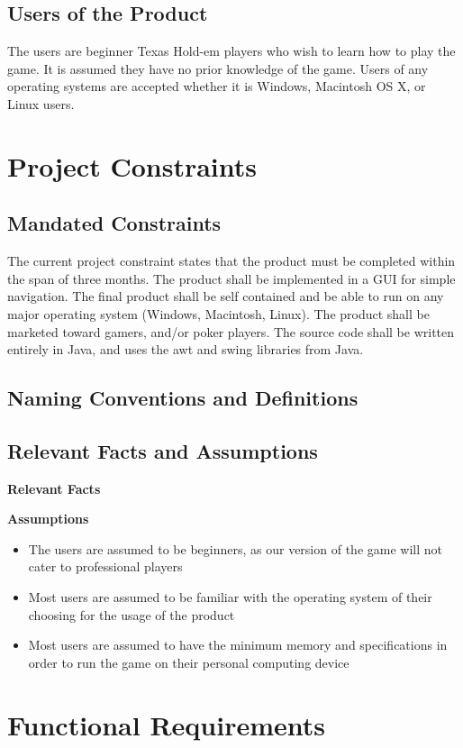 \documentclass[12pt]{article}
\begin{document}
	\subsection{Users of the Product}
	The users are beginner Texas Hold-em players who wish to learn how to play the game. It 	is assumed they have no prior knowledge of the game.  Users of any operating systems 		are accepted whether it is Windows, Macintosh OS X, or Linux users. 
	
	\section{Project Constraints}
	\subsection{Mandated Constraints}
	The current project constraint states that the product must be completed within the 		span of three months. The product shall be implemented in a GUI for simple navigation. 		The final product shall be self contained and be able to run on any major operating 		system (Windows, Macintosh, Linux). The product shall be marketed toward gamers, and/or 	poker players. The source code shall be written entirely in Java, and uses the awt and 		swing libraries from Java.
	\subsection{Naming Conventions and Definitions}
	
	\subsection{Relevant Facts and Assumptions}
	\textbf{Relevant Facts}
	
	\textbf{Assumptions}
	\begin{itemize}
	\item 	The users are assumed to be beginners, as our version of the game will not 					cater to professional players 
	\item 	Most users are assumed to be familiar with the operating system of their 					choosing for the usage of the product
	\item 	Most users are assumed to have the minimum memory and specifications in order 				to run the game on their personal computing device
	\end{itemize}

	\section{Functional Requirements}
\end{document}
